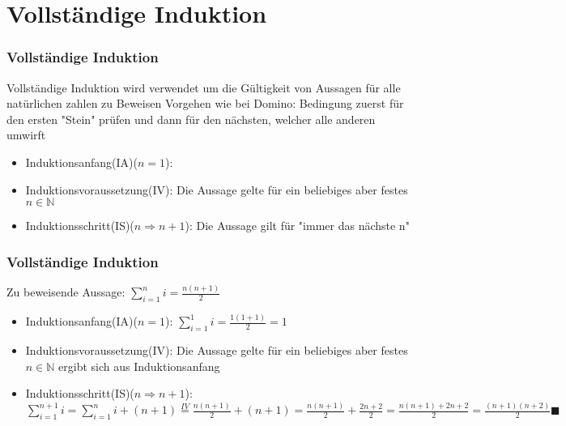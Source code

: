 \section{Vollständige Induktion}
\begin{frame}
    \frametitle{Vollständige Induktion}
    Vollständige Induktion wird verwendet um die Gültigkeit von Aussagen für alle natürlichen zahlen zu Beweisen
    \vfill
     Vorgehen wie bei Domino:
        \newline Bedingung zuerst für den ersten "Stein" prüfen und dann für den nächsten, welcher alle anderen umwirft
    \begin{itemize}
        
        \vfill \item Induktionsanfang(IA)($n=1$):
        \vfill \item Induktionsvoraussetzung(IV):
                \newline Die Aussage gelte für ein beliebiges aber festes $n \in \mathbb{N}$
        \vfill \item Induktionsschritt(IS)($n \Rightarrow n+1$):
        \newline Die Aussage gilt für "immer das nächste n"

    \end{itemize}
\end{frame}

\begin{frame}
    \frametitle{Vollständige Induktion}
    Zu beweisende Aussage: $\sum_{i=1}^{n} i = \frac{n(n+1)}{2}$
    \vfill
    \begin{itemize}
        \vfill \item Induktionsanfang(IA)($n=1$):
                \newline $\sum_{i=1}^{1} i = \frac{1(1+1)}{2} = 1$
        \vfill \item Induktionsvoraussetzung(IV):
                \newline Die Aussage gelte für ein beliebiges aber festes $n \in \mathbb{N}$
                ergibt sich aus Induktionsanfang
        \vfill \item Induktionsschritt(IS)($n \Rightarrow n+1$):
                \newline $\sum_{i=1}^{n+1} i = \sum_{i=1}^{n} i + (n+1) \stackrel{IV}{=} \frac{n(n+1)}{2} + (n+1) = \frac{n(n+1)}{2} + \frac{2n+2}{2} = \frac{n(n+1)+2n+2}{2} = \frac{(n+1)(n+2)}{2} \blacksquare$

    \end{itemize}
\end{frame}

